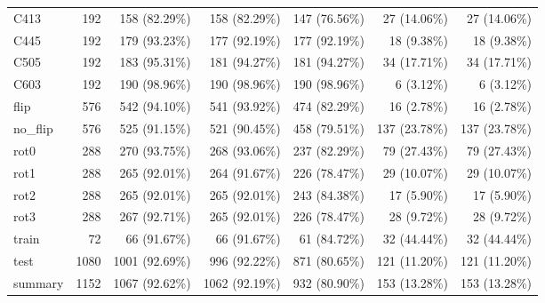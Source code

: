 \begin{longtable}{>{\raggedright\arraybackslash}p{5cm}rrrrrr}
C413 & 192 & 158 (82.29\%) & 158 (82.29\%) & 147 (76.56\%) & 27 (14.06\%) & 27 (14.06\%) \\
C445 & 192 & 179 (93.23\%) & 177 (92.19\%) & 177 (92.19\%) & 18 (9.38\%) & 18 (9.38\%) \\
C505 & 192 & 183 (95.31\%) & 181 (94.27\%) & 181 (94.27\%) & 34 (17.71\%) & 34 (17.71\%) \\
C603 & 192 & 190 (98.96\%) & 190 (98.96\%) & 190 (98.96\%) & 6 (3.12\%) & 6 (3.12\%) \\
flip & 576 & 542 (94.10\%) & 541 (93.92\%) & 474 (82.29\%) & 16 (2.78\%) & 16 (2.78\%) \\
no\_flip & 576 & 525 (91.15\%) & 521 (90.45\%) & 458 (79.51\%) & 137 (23.78\%) & 137 (23.78\%) \\
rot0 & 288 & 270 (93.75\%) & 268 (93.06\%) & 237 (82.29\%) & 79 (27.43\%) & 79 (27.43\%) \\
rot1 & 288 & 265 (92.01\%) & 264 (91.67\%) & 226 (78.47\%) & 29 (10.07\%) & 29 (10.07\%) \\
rot2 & 288 & 265 (92.01\%) & 265 (92.01\%) & 243 (84.38\%) & 17 (5.90\%) & 17 (5.90\%) \\
rot3 & 288 & 267 (92.71\%) & 265 (92.01\%) & 226 (78.47\%) & 28 (9.72\%) & 28 (9.72\%) \\
train & 72 & 66 (91.67\%) & 66 (91.67\%) & 61 (84.72\%) & 32 (44.44\%) & 32 (44.44\%) \\
test & 1080 & 1001 (92.69\%) & 996 (92.22\%) & 871 (80.65\%) & 121 (11.20\%) & 121 (11.20\%) \\
summary & 1152 & 1067 (92.62\%) & 1062 (92.19\%) & 932 (80.90\%) & 153 (13.28\%) & 153 (13.28\%) \\
\end{longtable}
